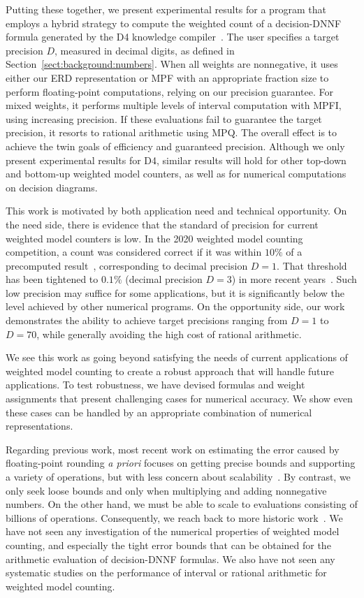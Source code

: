 \documentclass{easychair}
\begin{document}
Putting these together, we present experimental results for a program
that employs a hybrid strategy to compute the weighted count of a decision-DNNF formula
generated by the D4 knowledge compiler~\cite{lagniez:ijcai:2017}.
The user specifies a target precision $D$, measured in decimal digits, as defined in Section~\ref{sect:background:numbers}.
When all weights are nonnegative, it uses either our ERD representation or MPF with an appropriate fraction size to
perform floating-point computations, relying on our precision
guarantee.  For mixed weights, it performs multiple levels
of interval computation with MPFI, using increasing precision.  If these evaluations fail to guarantee the target precision,
it resorts to rational arithmetic using MPQ\@.  The overall effect
is to achieve the twin goals of efficiency and guaranteed precision.
Although we only present experimental results for D4, similar results will hold for other top-down and bottom-up weighted model counters, as well as
for numerical computations on decision diagrams.

This work is motivated by both application need and technical
opportunity.  On the need side, there is evidence that the standard of
precision for current weighted model counters is low.  In the 2020
weighted model counting competition, a count was considered correct if
it was within $10\%$ of a precomputed result~\cite{fichte:jea:2020},
corresponding to decimal precision $D=1$.  That threshold has been
tightened to $0.1\%$ (decimal precision $D=3$) in more recent
years~\cite{hecher:mc:2024}.  Such low precision may suffice for some
applications, but it is significantly below the level achieved by
other numerical programs.  On the opportunity side, our work
demonstrates the ability to achieve target precisions ranging from
$D=1$ to $D=70$, while generally avoiding the high cost of rational
arithmetic.

We see this work as going beyond satisfying the needs of current
applications of weighted model counting to create a robust approach
that will handle future applications.  To test robustness, we have
devised formulas and weight assignments that present challenging cases
for numerical accuracy.  We show even these cases can be handled by an
appropriate combination of numerical representations.

Regarding previous work, most recent work on estimating the error
caused by floating-point rounding \emph{a priori} focuses on getting precise bounds
and supporting a variety of
operations, but with less concern about scalability~\cite{becker:fmcad:2016,magron:toms:2017,solovyev:toplas:2018}.
By contrast, we only seek
loose bounds and only when multiplying and
adding nonnegative numbers.  On the other hand, we must be able to scale to evaluations consisting of billions of operations.
Consequently, we reach back to
more historic work~\cite{wilkinson:nm:1960,wilkinson:rounding:1964}.
We have not seen any investigation of the numerical properties of weighted model counting, and especially
the tight error bounds that can be obtained for the arithmetic evaluation of decision-DNNF formulas.
We also have not seen any systematic studies on the performance of interval or rational arithmetic for
weighted model counting.
\end{document}
